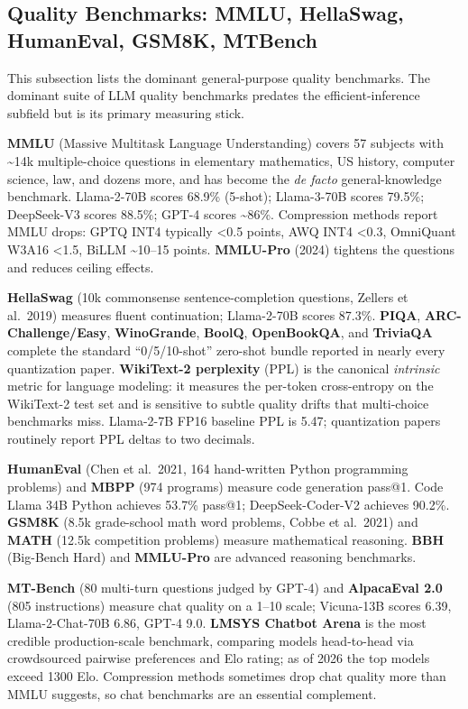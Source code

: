 \subsection{Quality Benchmarks: MMLU, HellaSwag, HumanEval, GSM8K, MTBench}\label{quality-benchmarks-mmlu-hellaswag-humaneval-gsm8k-mtbench}

This subsection lists the dominant general-purpose quality benchmarks. The dominant suite of LLM quality benchmarks predates the efficient-inference subfield but is its primary measuring stick.

\textbf{MMLU} (Massive Multitask Language Understanding) covers 57 subjects with \textasciitilde14k multiple-choice questions in elementary mathematics, US history, computer science, law, and dozens more, and has become the \emph{de facto} general-knowledge benchmark. Llama-2-70B scores 68.9\% (5-shot); Llama-3-70B scores 79.5\%; DeepSeek-V3 scores 88.5\%; GPT-4 scores \textasciitilde86\%. Compression methods report MMLU drops: GPTQ INT4 typically \textless0.5 points, AWQ INT4 \textless0.3, OmniQuant W3A16 \textless1.5, BiLLM \textasciitilde10--15 points. \textbf{MMLU-Pro} (2024) tightens the questions and reduces ceiling effects.

\textbf{HellaSwag} (10k commonsense sentence-completion questions, Zellers et al.~2019) measures fluent continuation; Llama-2-70B scores 87.3\%. \textbf{PIQA}, \textbf{ARC-Challenge/Easy}, \textbf{WinoGrande}, \textbf{BoolQ}, \textbf{OpenBookQA}, and \textbf{TriviaQA} complete the standard ``0/5/10-shot'' zero-shot bundle reported in nearly every quantization paper. \textbf{WikiText-2 perplexity} (PPL) is the canonical \emph{intrinsic} metric for language modeling: it measures the per-token cross-entropy on the WikiText-2 test set and is sensitive to subtle quality drifts that multi-choice benchmarks miss. Llama-2-7B FP16 baseline PPL is 5.47; quantization papers routinely report PPL deltas to two decimals.

\textbf{HumanEval} (Chen et al.~2021, 164 hand-written Python programming problems) and \textbf{MBPP} (974 programs) measure code generation pass@1. Code Llama 34B Python achieves 53.7\% pass@1; DeepSeek-Coder-V2 achieves 90.2\%. \textbf{GSM8K} (8.5k grade-school math word problems, Cobbe et al.~2021) and \textbf{MATH} (12.5k competition problems) measure mathematical reasoning. \textbf{BBH} (Big-Bench Hard) and \textbf{MMLU-Pro} are advanced reasoning benchmarks.

\textbf{MT-Bench} (80 multi-turn questions judged by GPT-4) and \textbf{AlpacaEval 2.0} (805 instructions) measure chat quality on a 1--10 scale; Vicuna-13B scores 6.39, Llama-2-Chat-70B 6.86, GPT-4 9.0. \textbf{LMSYS Chatbot Arena} is the most credible production-scale benchmark, comparing models head-to-head via crowdsourced pairwise preferences and Elo rating; as of 2026 the top models exceed 1300 Elo. Compression methods sometimes drop chat quality more than MMLU suggests, so chat benchmarks are an essential complement.

